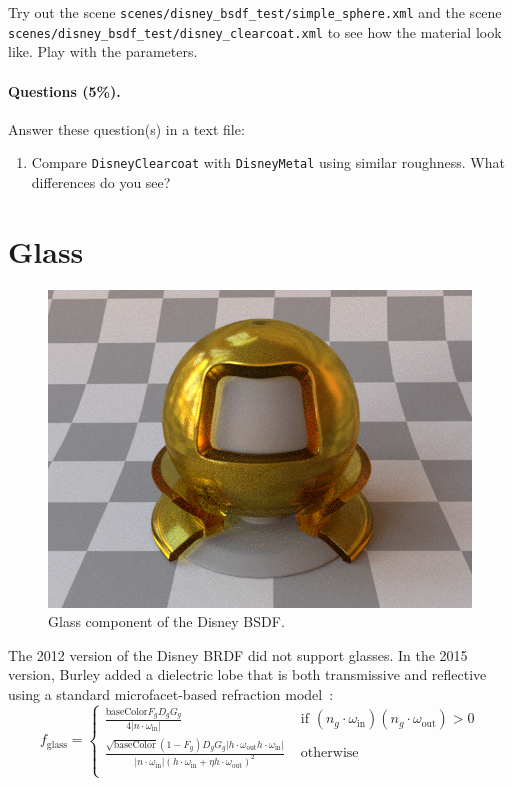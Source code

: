 Try out the scene \lstinline{scenes/disney_bsdf_test/simple_sphere.xml} and the scene \lstinline{scenes/disney_bsdf_test/disney_clearcoat.xml} to see how the material look like. Play with the parameters.

\paragraph{Questions (5\%).} Answer these question(s) in a text file:
\begin{enumerate}
	\item Compare \lstinline{DisneyClearcoat} with \lstinline{DisneyMetal} using similar roughness. What differences do you see?
\end{enumerate}

\section{Glass}
\begin{figure}
	\centering
	\includegraphics[width=0.5\linewidth]{imgs/disney_glass.png}
	\caption{Glass component of the Disney BSDF.}
\end{figure}

The 2012 version of the Disney BRDF did not support glasses. In the 2015 version, Burley added a dielectric lobe that is both transmissive and reflective using a standard microfacet-based refraction model~\cite{Walter:2007:MMR}:
\begin{equation}
f_{\text{glass}} = \begin{cases}
\frac{\text{baseColor} F_g D_g G_g}{4 |n \cdot \omega_{\text{in}}|} & \mbox{ if } \left(n_g \cdot \omega_{\text{in}}\right) \left(n_g \cdot \omega_{\text{out}}\right) > 0 \\
\frac{\sqrt{\text{baseColor}} (1 - F_g) D_g G_g \left|h \cdot \omega_{\text{out}} h \cdot \omega_{\text{in}} \right|}{
\left|n \cdot \omega_{\text{in}}\right| \left( h \cdot \omega_{\text{in}} + \eta h \cdot \omega_{\text{out}} \right)^2} & \mbox{ otherwise}\\
\end{cases}
\label{eq:f_glass}
\end{equation}

